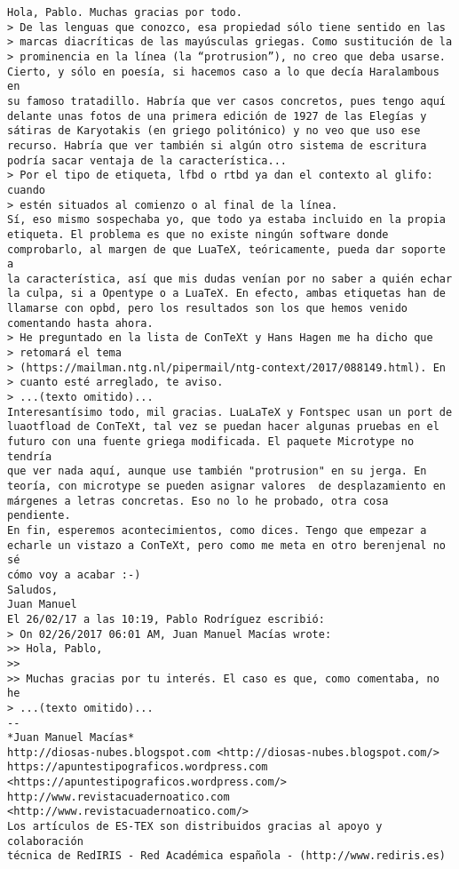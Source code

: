 \documentclass[a4paper,10pt]{article}
\begin{document}
\begin{lstlisting}
Hola, Pablo. Muchas gracias por todo.
> De las lenguas que conozco, esa propiedad sólo tiene sentido en las
> marcas diacríticas de las mayúsculas griegas. Como sustitución de la
> prominencia en la línea (la “protrusion”), no creo que deba usarse.
Cierto, y sólo en poesía, si hacemos caso a lo que decía Haralambous en
su famoso tratadillo. Habría que ver casos concretos, pues tengo aquí
delante unas fotos de una primera edición de 1927 de las Elegías y
sátiras de Karyotakis (en griego politónico) y no veo que uso ese
recurso. Habría que ver también si algún otro sistema de escritura
podría sacar ventaja de la característica...
> Por el tipo de etiqueta, lfbd o rtbd ya dan el contexto al glifo: cuando
> estén situados al comienzo o al final de la línea.
Sí, eso mismo sospechaba yo, que todo ya estaba incluido en la propia
etiqueta. El problema es que no existe ningún software donde
comprobarlo, al margen de que LuaTeX, teóricamente, pueda dar soporte a
la característica, así que mis dudas venían por no saber a quién echar
la culpa, si a Opentype o a LuaTeX. En efecto, ambas etiquetas han de
llamarse con opbd, pero los resultados son los que hemos venido
comentando hasta ahora.
> He preguntado en la lista de ConTeXt y Hans Hagen me ha dicho que
> retomará el tema
> (https://mailman.ntg.nl/pipermail/ntg-context/2017/088149.html). En
> cuanto esté arreglado, te aviso.
> ...(texto omitido)...
Interesantísimo todo, mil gracias. LuaLaTeX y Fontspec usan un port de
luaotfload de ConTeXt, tal vez se puedan hacer algunas pruebas en el
futuro con una fuente griega modificada. El paquete Microtype no tendría
que ver nada aquí, aunque use también "protrusion" en su jerga. En
teoría, con microtype se pueden asignar valores  de desplazamiento en
márgenes a letras concretas. Eso no lo he probado, otra cosa pendiente.
En fin, esperemos acontecimientos, como dices. Tengo que empezar a
echarle un vistazo a ConTeXt, pero como me meta en otro berenjenal no sé
cómo voy a acabar :-)
Saludos,
Juan Manuel
El 26/02/17 a las 10:19, Pablo Rodríguez escribió:
> On 02/26/2017 06:01 AM, Juan Manuel Macías wrote:
>> Hola, Pablo,
>>
>> Muchas gracias por tu interés. El caso es que, como comentaba, no he
> ...(texto omitido)...
-- 
*Juan Manuel Macías*
http://diosas-nubes.blogspot.com <http://diosas-nubes.blogspot.com/>
https://apuntestipograficos.wordpress.com
<https://apuntestipograficos.wordpress.com/>
http://www.revistacuadernoatico.com <http://www.revistacuadernoatico.com/>
Los artículos de ES-TEX son distribuidos gracias al apoyo y colaboración 
técnica de RedIRIS - Red Académica española - (http://www.rediris.es)

\end{lstlisting}
\end{document}
